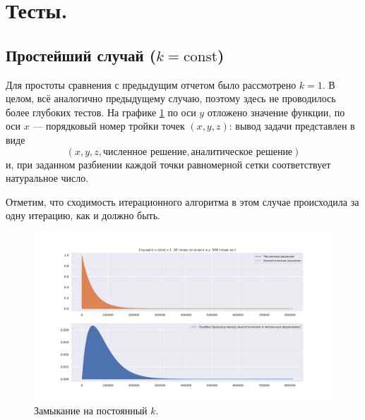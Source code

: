 \documentclass[14pt,a4paper]{extarticle}
\newcommand{\1}{\mathbbm{1}}
\begin{document}
\section{Тесты.}
\subsection{Простейший случай ($k = \text{const}$)}
Для простоты сравнения с предыдущим отчетом было рассмотрено $k=1$. В целом, всё аналогично 
предыдущему случаю, поэтому здесь не проводилось более глубоких тестов. На графике \ref{constk} по оси $y$ отложено значение функции, 
по оси $x$ --- порядковый номер тройки точек $(x, y, z)$: вывод задачи представлен в виде 
$$
(x,y,z,\text{численное решение}, \text{аналитическое решение})
$$ 
и, при 
заданном разбиении каждой точки равномерной сетки соответствует натуральное число.  

Отметим, что сходимость итерационного алгоритма в этом случае происходила за одну итерацию, как и должно быть.

\begin{figure}
    \centering
    \includegraphics[scale=0.44]{figs/constantksol.pdf}
    \caption{Замыкание на постоянный $k$.}
    \label{constk}
\end{figure}
\end{document}
